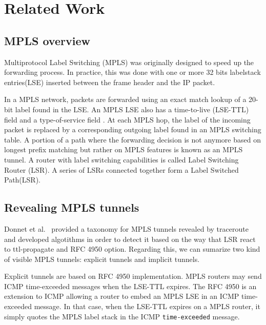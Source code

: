 \section{Related Work}\label{Related}

\subsection{MPLS overview}\label{Related.mpls}
Multiprotocol Label Switching (MPLS) \cite{REF} was originally designed
to speed up the forwarding process. In practice, this was done with one or more
32 bits labelstack entries(LSE) inserted between the frame header  and the IP
packet.

In a MPLS network, packets are forwarded using an exact match lookup of a 20-bit
label found in the LSE. An MPLS LSE also has a time-to-live (LSE-TTL) field and
a type-of-service field \cite{rfc1771}. At each MPLS hop, the label of the
incoming packet is replaced by a corresponding outgoing label found in an MPLS
switching table. A portion of a path where the forwarding decision is not
anymore based on longest prefix matching but rather on MPLS features is known as
an MPLS tunnel. A router with label switching capabilities is called Label
Switching Router (LSR). A series of LSRs connected together form a Label
Switched Path(LSR).

\subsection{Revealing MPLS tunnels}

Donnet et al.~\cite{Donnet12} provided a taxonomy for MPLS tunnels revealed by
traceroute and developed algotithms in order to detect it based on the way that
LSR react to ttl-propagate  and RFC 4950 option. Regarding this, we can sumarize
two kind of visible MPLS tunnels: explicit tunnels and implicit tunnels.

Explicit tunnels are based on RFC 4950 implementation. MPLS routers may send
ICMP time-exceeded messages when the LSE-TTL expires. The RFC 4950 is an
extension to ICMP allowing a router to embed an MPLS LSE in an ICMP
time-exceeded message. In that case, when the LSE-TTL expires on a MPLS router,
it simply quotes the MPLS label stack in the ICMP \texttt{time-exceeded}
message.

